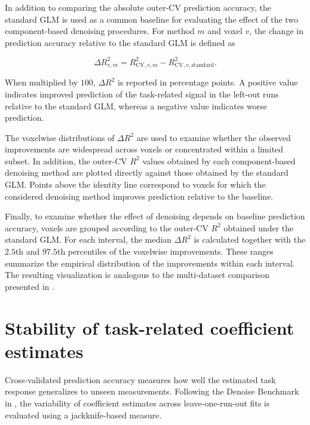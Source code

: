 \documentclass[english]{pwr_wmat_praca_dyplomowa}
\theoremstyle{definition}
\theoremstyle{remark}
\begin{document}
In addition to comparing the absolute outer-CV prediction accuracy, the standard GLM is used as a common baseline for evaluating the effect of the two component-based denoising procedures. For method $m$ and voxel $v$, the change in prediction accuracy relative to the standard GLM is defined as

\begin{equation}
    \Delta R^2_{v,m}
    =
    R^2_{\mathrm{CV},v,m}
    -
    R^2_{\mathrm{CV},v,\mathrm{standard}}.
    \label{eq:delta-r2-standard}
\end{equation}

When multiplied by $100$, $\Delta R^2$ is reported in percentage points. A positive value indicates improved prediction of the task-related signal in the left-out runs relative to the standard GLM, whereas a negative value indicates worse prediction.

The voxelwise distributions of $\Delta R^2$ are used to examine whether the observed improvements are widespread across voxels or concentrated within a limited subset. In addition, the outer-CV $R^2$ values obtained by each component-based denoising method are plotted directly against those obtained by the standard GLM. Points above the identity line correspond to voxels for which the considered denoising method improves prediction relative to the baseline.

Finally, to examine whether the effect of denoising depends on baseline prediction accuracy, voxels are grouped according to the outer-CV $R^2$
obtained under the standard GLM. For each interval, the median $\Delta R^2$ is calculated together with the $2.5$th and $97.5$th percentiles of the voxelwise improvements. These ranges summarize the empirical distribution of the improvements within each interval. The resulting visualization is analogous to the multi-dataset comparison presented in \cite[Figure~4]{glm-denoise}.

\section{Stability of task-related coefficient estimates}
\label{section:jackknife-snr}

Cross-validated prediction accuracy measures how well the estimated task response generalizes to unseen measurements. Following the Denoise Benchmark in \cite{glm-denoise}, the variability of coefficient estimates across leave-one-run-out fits is evaluated using a jackknife-based measure.
\end{document}
